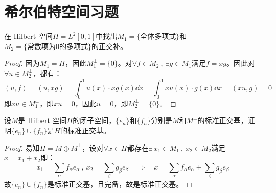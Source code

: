 \section*{希尔伯特空间习题}
\begin{example}
\quad 在 Hilbert 空间$H=L^2[0,1]$中找出$M_1=\{\text{全体多项式}\}$和$M_2=\{\text{常数项为0的多项式}\}$的正交补。
\end{example}
\begin{proof}
因为$\overline{M_1}=H$，因此$M_1^{\perp}=\{0\}$。对$\forall f \in M_2 \ , \ \exists g \in M_1$满足$f=xg$。因此对$\forall u \in M_2^{\perp}$，都有：
\[(u,f)=(u,xg)=\int_0^1u(x) \cdot xg(x)\dd{x}=\int_0^1xu(x) \cdot g(x)\dd{x}=(xu,g)=0\]
即$xu \in M_1^{\perp}$，即$xu=0$，因此$u=0$，即$M_2^{\perp}=\{0\}$。
\end{proof}

\begin{example}
\quad 设$M$是 Hilbert 空间$H$的闭子空间，$\{e_n\}$和$\{f_n\}$分别是$M$和$M^{\perp}$的标准正交基，证明$\{e_n\}\cup\{f_n\}$是$H$的标准正交基。
\end{example}
\begin{proof}
易知$H=M \oplus M^{\perp}$，设对$\forall x \in H$都存在$\exists \, x_1 \in M_1 \ , \ x_2 \in M_2$满足$x=x_1+x_2$即：
\[x_1=\sum_{\alpha}f_{\alpha}e_{\alpha} \ , \ x_2=\sum_{\beta}g_{\beta}e_{\beta} \quad \Rightarrow \quad x=\sum_{\alpha}f_{\alpha}e_{\alpha}+\sum_{\beta}g_{\beta}e_{\beta}\]
故$\{e_n\}\cup\{f_n\}$是标准正交基，且完备，故是标准正交基。
\end{proof}

